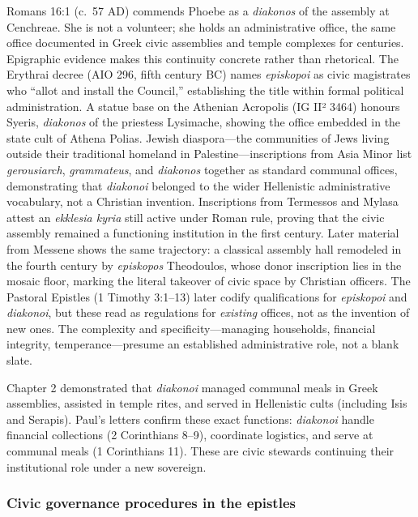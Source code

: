 Romans 16:1 (c.~57 AD) commends Phoebe as a \textit{diakonos} of the assembly at Cenchreae.
She is not a volunteer; she holds an administrative office, the same office documented in Greek civic assemblies and temple complexes for centuries.
Epigraphic evidence makes this continuity concrete rather than rhetorical.
The Erythrai decree (AIO 296, fifth century BC) names \textit{episkopoi} as civic magistrates who ``allot and install the Council,'' establishing the title within formal political administration.
A statue base on the Athenian Acropolis (IG II² 3464) honours Syeris, \textit{diakonos} of the priestess Lysimache, showing the office embedded in the state cult of Athena Polias.
Jewish diaspora---the communities of Jews living outside their traditional homeland in Palestine---inscriptions from Asia Minor list \textit{gerousiarch}, \textit{grammateus}, and \textit{diakonos} together as standard communal offices, demonstrating that \textit{diakonoi} belonged to the wider Hellenistic administrative vocabulary, not a Christian invention.
Inscriptions from Termessos and Mylasa attest an \textit{ekklesia kyria} still active under Roman rule, proving that the civic assembly remained a functioning institution in the first century.
Later material from Messene shows the same trajectory: a classical assembly hall remodeled in the fourth century by \textit{episkopos} Theodoulos, whose donor inscription lies in the mosaic floor, marking the literal takeover of civic space by Christian officers.
The Pastoral Epistles (1 Timothy 3:1--13) later codify qualifications for \textit{episkopoi} and \textit{diakonoi}, but these read as regulations for \emph{existing} offices, not as the invention of new ones.
The complexity and specificity---managing households, financial integrity, temperance---presume an established administrative role, not a blank slate.

Chapter 2 demonstrated that \textit{diakonoi} managed communal meals in Greek assemblies, assisted in temple rites, and served in Hellenistic cults (including Isis and Serapis).
Paul's letters confirm these exact functions: \textit{diakonoi} handle financial collections (2 Corinthians 8--9), coordinate logistics, and serve at communal meals (1 Corinthians 11).
These are civic stewards continuing their institutional role under a new sovereign.

\subsubsection{Civic governance procedures in the epistles}\label{subsubsec:civic-governance-procedures-in-the-epistles}

